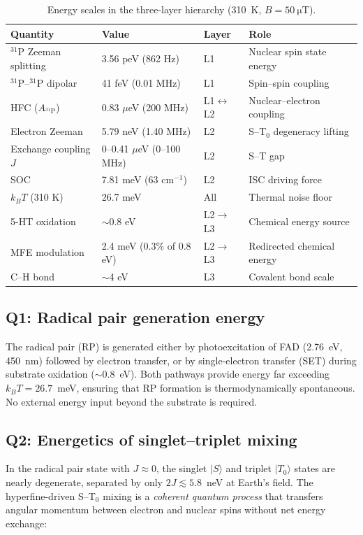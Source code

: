 \documentclass[11pt]{article}
\begin{document}
\begin{table}[h]
\centering
\caption{Energy scales in the three-layer hierarchy (310~K, $B = 50~\si{\micro\tesla}$).}
\label{tab:energy_budget}
\small
\begin{tabular}{@{}llll@{}}
\toprule
Quantity & Value & Layer & Role \\
\midrule
$^{31}$P Zeeman splitting & 3.56 peV (862 Hz) & L1 & Nuclear spin state energy \\
$^{31}$P--$^{31}$P dipolar & 41 feV (0.01 MHz) & L1 & Spin--spin coupling \\
HFC ($A_{^{31}\mathrm{P}}$) & 0.83 $\mu$eV (200 MHz) & L1$\leftrightarrow$L2 & Nuclear--electron coupling \\
Electron Zeeman & 5.79 neV (1.40 MHz) & L2 & S--T$_0$ degeneracy lifting \\
Exchange coupling $J$ & 0--0.41 $\mu$eV (0--100 MHz) & L2 & S--T gap \\
SOC & 7.81 meV (63 cm$^{-1}$) & L2 & ISC driving force \\
$k_BT$ (310 K) & 26.7 meV & All & Thermal noise floor \\
5-HT oxidation & $\sim$0.8 eV & L2$\to$L3 & Chemical energy source \\
MFE modulation & 2.4 meV (0.3\% of 0.8 eV) & L2$\to$L3 & Redirected chemical energy \\
C--H bond & $\sim$4 eV & L3 & Covalent bond scale \\
\bottomrule
\end{tabular}
\end{table}

\subsection{Q1: Radical pair generation energy}

The radical pair (RP) is generated either by photoexcitation of FAD (2.76~eV, 450~nm) followed by electron transfer, or by single-electron transfer (SET) during substrate oxidation ($\sim$0.8~eV)\cite{Edmondson2004}. Both pathways provide energy far exceeding $k_BT = 26.7$~meV, ensuring that RP formation is thermodynamically spontaneous. No external energy input beyond the substrate is required.

\subsection{Q2: Energetics of singlet--triplet mixing}

In the radical pair state with $J \approx 0$, the singlet $|S\rangle$ and triplet $|T_0\rangle$ states are nearly degenerate, separated by only $2J \lesssim 5.8$~neV at Earth's field. The hyperfine-driven S--T$_0$ mixing is a \emph{coherent quantum process} that transfers angular momentum between electron and nuclear spins without net energy exchange\cite{Steiner1989,Hore2016}:
\end{document}
